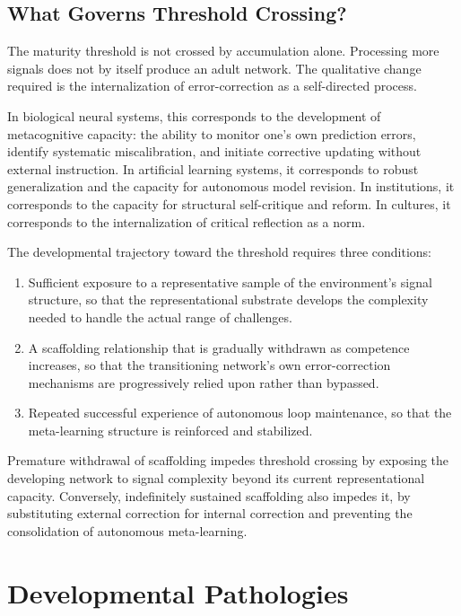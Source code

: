 \documentclass[11pt]{article}
\begin{document}
\subsection{What Governs Threshold Crossing?}

The maturity threshold is not crossed by accumulation alone. Processing more signals does not
by itself produce an adult network. The qualitative change required is the internalization of
error-correction as a self-directed process.

In biological neural systems, this corresponds to the development of metacognitive capacity:
the ability to monitor one's own prediction errors, identify systematic miscalibration, and
initiate corrective updating without external instruction. In artificial learning systems, it
corresponds to robust generalization and the capacity for autonomous model revision. In
institutions, it corresponds to the capacity for structural self-critique and reform. In cultures,
it corresponds to the internalization of critical reflection as a norm.

The developmental trajectory toward the threshold requires three conditions:

\begin{enumerate}
    \item Sufficient exposure to a representative sample of the environment's signal structure,
          so that the representational substrate develops the complexity needed to handle the
          actual range of challenges.
    \item A scaffolding relationship that is gradually withdrawn as competence increases,
          so that the transitioning network's own error-correction mechanisms are progressively
          relied upon rather than bypassed.
    \item Repeated successful experience of autonomous loop maintenance, so that the
          meta-learning structure is reinforced and stabilized.
\end{enumerate}

Premature withdrawal of scaffolding impedes threshold crossing by exposing the developing
network to signal complexity beyond its current representational capacity. Conversely, indefinitely
sustained scaffolding also impedes it, by substituting external correction for internal correction
and preventing the consolidation of autonomous meta-learning.

\section{Developmental Pathologies}
\label{sec:pathologies}
\end{document}
